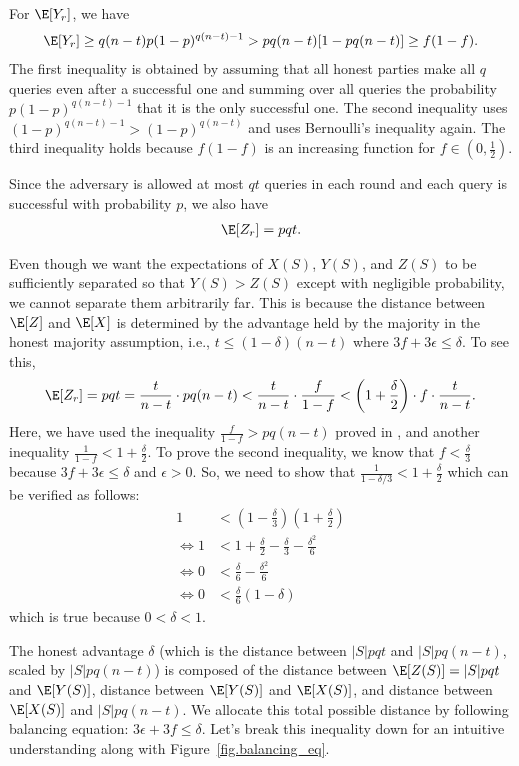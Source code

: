 For $\E[Y_r]$, we have
\begin{align}
\label{eq.y_lower_bound}
    \E[Y_r]  \geq q(n-t)p (1-p)^{q(n-t)-1} > pq(n-t)[1-pq(n-t)] \geq f (1-f).
\end{align}
The first inequality is obtained by assuming that all honest parties make all $q$ queries even after a successful one and summing over all queries the probability $p(1-p)^{q(n-t)-1}$ that it is the only successful one.
The second inequality uses $(1-p)^{q(n-t)-1} > (1-p)^{q(n-t)}$ and uses Bernoulli's inequality again.
The third inequality holds because $f(1-f)$ is an increasing function for $f \in (0,\frac12)$.

Since the adversary is allowed at most $qt$ queries in each round and each query is successful with probability $p$, we also have
\begin{align}
    \E[Z_r] = pqt.
\end{align}

Even though we want the expectations of $X(S)$, $Y(S)$, and $Z(S)$ to be sufficiently separated so that $Y(S) > Z(S)$ except with negligible probability, we cannot separate them arbitrarily far. This is because the distance between $\E[Z]$ and $\E[X]$ is determined by the advantage held by the majority in the honest majority assumption, i.e., $t \leq (1-\delta)(n-t)$ where $3f+3\epsilon \leq \delta$.
To see this,
\begin{align}
    \E[Z_r] = pqt = \frac{t}{n-t} \cdot pq(n-t) < \frac{t}{n-t} \cdot \frac{f}{1-f} < \left(1+\frac{\delta}{2}\right)\cdot f \cdot \frac{t}{n-t}.
\end{align}
Here, we have used the inequality $\frac{f}{1-f} > pq(n-t)$ proved in , and another inequality $\frac{1}{1-f} < 1 + \frac{\delta}{2}$. To prove the second inequality, we know that $f < \frac{\delta}{3}$ because $3f+3\epsilon \leq \delta$ and $\epsilon>0$. So, we need to show that $\frac{1}{1-\delta/3} < 1+\frac{\delta}{2}$ which can be verified as follows:
\begin{align*}
    1 &< \left(1-\frac{\delta}{3}\right) \left(1+\frac{\delta}{2}\right) \\
    \iff 1 &< 1 + \frac{\delta}{2} - \frac{\delta}{3} - \frac{\delta^2}{6} \\
    \iff 0 &< \frac{\delta}{6} - \frac{\delta^2}{6} \\
    \iff 0 &< \frac{\delta}{6}(1-\delta)
\end{align*}
which is true because $0 < \delta < 1$.

The honest advantage $\delta$ (which is the distance between $|S|pqt$ and $|S|pq(n-t)$, scaled by $|S|pq(n-t)$) is composed of the distance between $\E[Z(S)]=|S|pqt$ and $\E[Y(S)]$, distance between $\E[Y(S)]$ and $\E[X(S)]$, and distance between $\E[X(S)]$ and $|S|pq(n-t)$. We allocate this total possible distance by following balancing equation: $3\epsilon + 3f \leq \delta$. Let's break this inequality down for an intuitive understanding along with Figure~\ref{fig.balancing_eq}.

